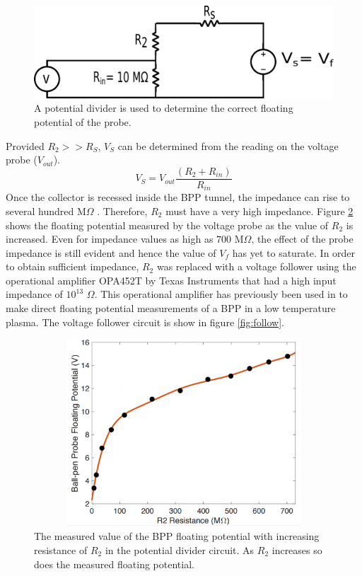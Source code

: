 \begin{figure}[H]
\centering
\includegraphics[width=1.0\textwidth]{divider_circuit.pdf}
\caption{A potential divider is used to determine the correct floating potential of the probe.}
\label{fig:emissive}
\end{figure}

Provided $R_2 >> R_S$, $V_S$ can be determined from the reading on the voltage probe ($V_{out}$). 
\begin{equation}
V_S = V_{out} \frac{(R_2+ R_{in})}{R_{in}} 
\end{equation}
Once the collector is recessed inside the BPP tunnel, the impedance can rise to several hundred M$\Omega$ \cite{mirabelle}. Therefore, $R_2$ must have a very high impedance. Figure \ref{fig:increasing_R} shows the floating potential measured by the voltage probe as the value of $R_2$ is increased. Even for impedance values as high as $700$ M$\Omega$, the effect of the probe impedance is still evident and hence the value of $V_f$  has yet to saturate. In order to obtain sufficient impedance, $R_2$ was replaced with a voltage follower using the operational amplifier OPA452T by Texas Instruments that had a high input impedance of $10^{13}$ $\Omega$. This operational amplifier has previously been used in \cite{low_t} to make direct floating potential measurements of a BPP in a low temperature plasma. The voltage follower circuit is show in figure \ref{fig:follow}. 




\begin{figure}[H]
\centering
\includegraphics[width=1.0\textwidth, height = 7cm]{increasing_R.pdf}
\caption{The measured value of the BPP floating potential with increasing resistance of $R_2$ in the potential divider circuit. As $R_2$ increases so does the measured floating potential. }
\label{fig:increasing_R}
\end{figure}


